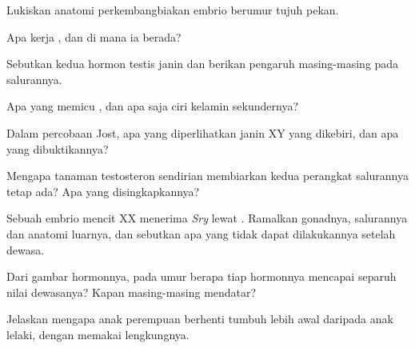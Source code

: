 \begin{exercise}[$\star$]\label{exo:g11:becoming-male-female:2}
Lukiskan anatomi perkembangbiakan embrio berumur tujuh pekan.
\end{exercise}

\begin{exercise}[$\star$]\label{exo:g11:becoming-male-female:3}
Apa kerja , dan di mana ia berada?
\end{exercise}

\begin{exercise}[$\star$]\label{exo:g11:becoming-male-female:4}
Sebutkan kedua hormon testis janin dan berikan pengaruh masing-masing
pada salurannya.
\end{exercise}

\begin{exercise}[$\star$]\label{exo:g11:becoming-male-female:5}
Apa yang memicu , dan apa saja ciri kelamin sekundernya?
\end{exercise}

\begin{exercise}[$\star\star$]\label{exo:g11:becoming-male-female:6}
Dalam percobaan Jost, apa yang diperlihatkan janin XY yang dikebiri,
dan apa yang dibuktikannya?
\end{exercise}

\begin{exercise}[$\star\star$]\label{exo:g11:becoming-male-female:7}
Mengapa tanaman testosteron sendirian membiarkan kedua perangkat
salurannya tetap ada? Apa yang disingkapkannya?
\end{exercise}

\begin{exercise}[$\star\star$]\label{exo:g11:becoming-male-female:8}
Sebuah embrio mencit XX menerima  \emph{Sry} lewat .
Ramalkan gonadnya, salurannya dan anatomi luarnya, dan sebutkan apa yang tidak
dapat dilakukannya setelah dewasa.
\end{exercise}

\begin{exercise}[$\star\star$]\label{exo:g11:becoming-male-female:9}
Dari gambar hormonnya, pada umur berapa tiap hormonnya mencapai separuh
nilai dewasanya? Kapan masing-masing mendatar?
\end{exercise}

\begin{exercise}[$\star\star$]\label{exo:g11:becoming-male-female:10}
Jelaskan mengapa anak perempuan berhenti tumbuh lebih awal daripada
anak lelaki, dengan memakai lengkungnya.
\end{exercise}

